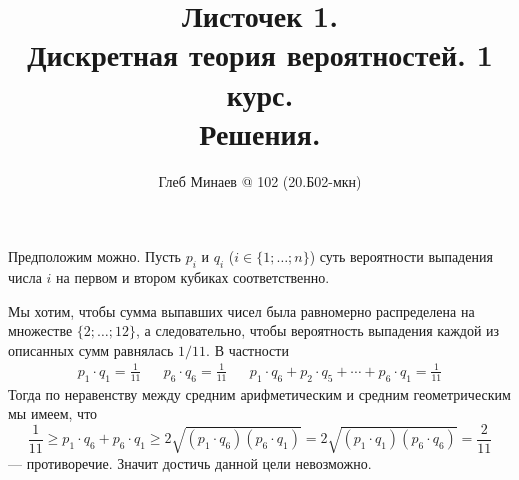 \documentclass[12pt,a4paper]{article}
\title{Листочек 1.\\Дискретная теория вероятностей. 1 курс.\\Решения.}
\author{Глеб Минаев @ 102 (20.Б02-мкн)}
\begin{document}
    \maketitle

    \begin{multicols}{2}
        \tableofcontents
    \end{multicols}

    \begin{enumproblem}
        Предположим можно. Пусть $p_i$ и $q_i$ ($i \in \{1; \dots; n\}$) суть вероятности выпадения числа $i$ на первом и втором кубиках соответственно.
        
        Мы хотим, чтобы сумма выпавших чисел была равномерно распределена на множестве $\{2; \dots; 12\}$, а следовательно, чтобы вероятность выпадения каждой из описанных сумм равнялась $1/11$. В частности
        \begin{align*}
            &p_1 \cdot q_1 = \frac{1}{11}&
            &p_6 \cdot q_6 = \frac{1}{11}&
            &p_1 \cdot q_6 + p_2 \cdot q_5 + \cdots + p_6 \cdot q_1 = \frac{1}{11}&
        \end{align*}
        Тогда по неравенству между средним арифметическим и средним геометрическим мы имеем, что
        \[
            \frac{1}{11}
            \geqslant p_1 \cdot q_6 + p_6 \cdot q_1
            \geqslant 2\sqrt{(p_1 \cdot q_6)(p_6 \cdot q_1)}
            = 2\sqrt{(p_1 \cdot q_1)(p_6 \cdot q_6)}
            = \frac{2}{11}
        \]
        --- противоречие. Значит достичь данной цели невозможно.
    \end{enumproblem}
\end{document}
